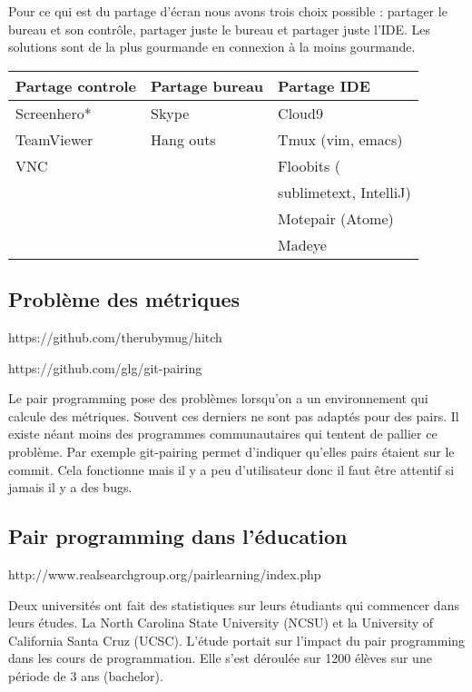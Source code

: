 \documentclass[journal, a4paper]{IEEEtran}
\begin{document}
Pour ce qui est du partage d’écran nous avons trois choix possible : partager le bureau et son
contrôle, partager juste le bureau et partager juste l’IDE. Les solutions sont de la plus gourmande en
connexion à la moins gourmande.

\begin{center}
    \begin{tabular}{| l | l | l|}
    \hline
    Partage controle & Partage bureau & Partage IDE  \\ \hline
    Screenhero* & Skype & Cloud9 \\
    TeamViewer & Hang outs & Tmux (vim, emacs) \\ 
    VNC &  & Floobits ( \\
     & &  \hspace{1mm}  sublimetext, IntelliJ)\\
     & & Motepair (Atome) \\
     & & Madeye \\
    \hline
    \end{tabular}
\end{center}

\subsection{Problème des métriques}
https://github.com/therubymug/hitch

https://github.com/glg/git-pairing

Le pair programming pose des problèmes lorsqu’on a un environnement qui calcule des métriques.
Souvent ces derniers ne sont pas adaptés pour des pairs. Il existe néant moins des programmes
communautaires qui tentent de pallier ce problème. Par exemple git-pairing permet d’indiquer
qu’elles pairs étaient sur le commit. Cela fonctionne mais il y a peu d’utilisateur donc il faut être
attentif si jamais il y a des bugs.

\subsection{Pair programming dans l’éducation}

http://www.realsearchgroup.org/pairlearning/index.php

Deux universités ont fait des statistiques sur leurs étudiants qui commencer dans leurs études. La
North Carolina State University (NCSU) et la University of California Santa Cruz (UCSC). L’étude
portait sur l’impact du pair programming dans les cours de programmation. Elle s’est déroulée sur
1200 élèves sur une période de 3 ans (bachelor).
\end{document}
